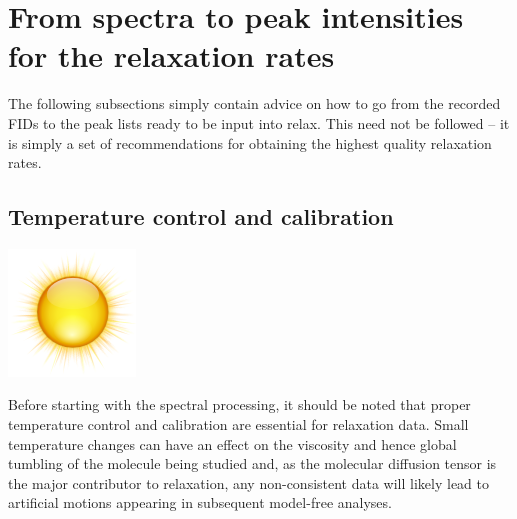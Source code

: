 
\section{From spectra to peak intensities for the relaxation rates} \label{sect: spectra to intensities}

The following subsections simply contain advice on how to go from the recorded FIDs to the peak lists ready to be input into relax.
This need not be followed -- it is simply a set of recommendations for obtaining the highest quality relaxation rates.



\subsection{Temperature control and calibration} \label{sect: temperature control and calibration}

\includegraphics[bb=0 0 18 18]{graphics/oxygen_icons/128x128/status/weather-clear}

Before starting with the spectral processing, it should be noted that proper temperature control and calibration are essential for relaxation data.
Small temperature changes can have an effect on the viscosity and hence global tumbling of the molecule being studied and, as the molecular diffusion tensor is the major contributor to relaxation, any non-consistent data will likely lead to artificial motions appearing in subsequent model-free analyses.

